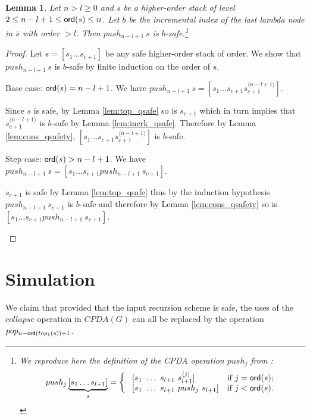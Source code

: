 \documentclass{article}
\newtheorem{lemma}{Lemma}[section]
\theoremstyle{remark}
\theoremstyle{definition}
\newcommand\orddec\overline
\begin{document}
\begin{lemma}
\label{lem:pushj_safe_implies_b-safe} Let $n>l\geq 0$ and $s$ be a higher-order stack
of level $2 \leq n-l+1 \leq {\sf ord}(s) \leq n$. Let $b$ be the incremental index of the last lambda node in $\orddec{s}$ with order $>l$. Then $push_{n-l+1}\ s$ is $b$-safe.\footnote{We reproduce here the definition of the
CPDA operation $push_j$ from \cite{hague-sto07}:
$$ push_j \underbrace{[ s_1 \ldots s_{l+1} ]}_{s} =
\left\{
  \begin{array}{ll}
\    [s_1\ \ldots\ s_{l+1}\ s_{l+1}^{\langle j \rangle}]  &\hbox{if $j = {\sf ord}(s)$;}\\
\    [s_1\ \ldots\ s_{l+1}\ push_j\ s_{l+1}]  &\hbox{if $j<{\sf ord}(s)$.}
 \end{array}
\right.
$$}
\end{lemma}
\begin{proof}
Let $s=[s_1 \ldots s_{c+1}]$ be any safe higher-order stack of order. We show that $push_{n-l+1}~s$ is $b$-safe by finite induction on the order of $s$.
    \begin{compactitem}
      \item Base case: ${\sf ord}(s) = n-l+1 $. We have
    $push_{n-l+1}~s = [ s_1 \ldots s_{c+1} s_{c+1}^{\langle n-l+1
    \rangle}]$.

    Since $s$ is safe, by Lemma \ref{lem:top_qsafe} so is $s_{c+1}$
    which in turn implies that $s_{c+1}^{\langle n-l+1\rangle}$ is
    $b$-safe by Lemma \ref{lem:incrk_qsafe}. Therefore by Lemma
    \ref{lem:cons_qsafety},  $[ s_1 \ldots s_{c+1} s_{c+1}^{\langle n-l+1
    \rangle}]$ is $b$-safe.

      \item Step case: ${\sf ord}(s) > n-l+1$. We have
    $push_{n-l+1}~s = [ s_1 \ldots s_{c+1} push_{n-l+1}~s_{c+1}]$.

    $s_{c+1}$ is safe by Lemma \ref{lem:top_qsafe} thus by the
    induction hypothesis $push_{n-l+1}~s_{c+1}$ is $b$-safe and therefore by Lemma \ref{lem:cons_qsafety} so
    is $[ s_1 \ldots s_{c+1} push_{n-l+1}~s_{c+1}]$.
    \end{compactitem}
\end{proof}





\section{Simulation}

We claim that provided that the input recursion scheme is safe, the
uses of the $collapse$ operation in $CPDA(G)$ can all be replaced by the operation $pop_{n-{\sf ord}(top_1(s))+1}$.
\end{document}
